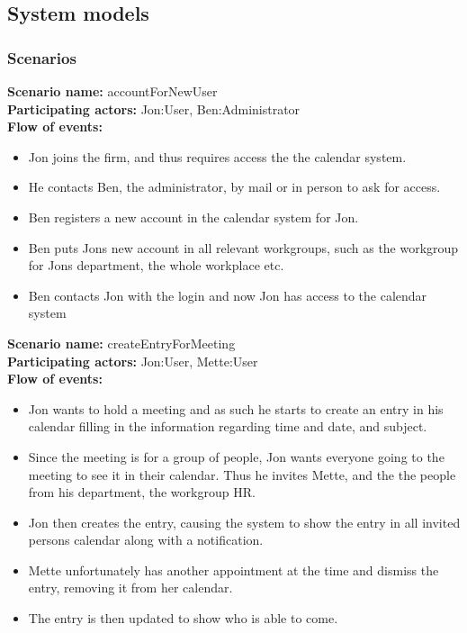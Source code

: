 \subsection{System models}

\subsubsection{Scenarios}
\textbf{Scenario name:} accountForNewUser
\\
\textbf{Participating actors:} Jon:User, Ben:Administrator
\\
\textbf{Flow of events:}
\begin{itemize}
\item Jon joins the firm, and thus requires access the the calendar system.
\item He contacts Ben, the administrator, by mail or in person to ask for access.
\item Ben registers a new account in the calendar system for Jon.
\item Ben puts Jons new account in all relevant workgroups, such as the workgroup for Jons department, the whole workplace etc.
\item Ben contacts Jon with the login and now Jon has access to the calendar system

\end{itemize}
\textbf{Scenario name:} createEntryForMeeting
\\
\textbf{Participating actors:} Jon:User, Mette:User
\\
\textbf{Flow of events:}
\begin{itemize}
\item Jon wants to hold a meeting and as such he starts to create an entry in his calendar filling in the information regarding time and date, and subject.
\item Since the meeting is for a group of people, Jon wants everyone going to the meeting to see it in their calendar. Thus he invites Mette, and the the people from his department, the workgroup HR.
\item Jon then creates the entry, causing the system to show the entry in all invited persons calendar along with a notification.
\item Mette unfortunately has another appointment at the time and dismiss the entry, removing it from her calendar.
\item The entry is then updated to show who is able to come.

\end{itemize}
\pagebreak
